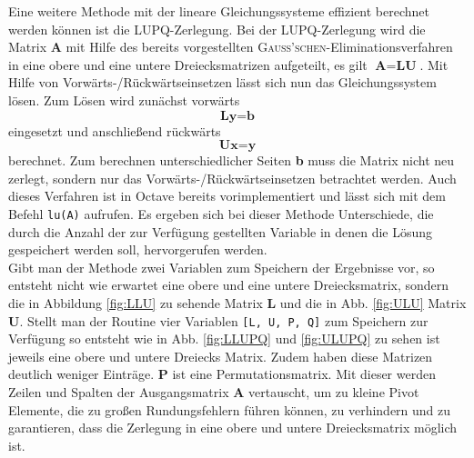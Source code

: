 Eine weitere Methode mit der lineare Gleichungssysteme effizient berechnet werden können ist die LUPQ-Zerlegung. Bei der LUPQ-Zerlegung wird die Matrix \textbf{A} mit Hilfe des bereits vorgestellten \textsc{Gauss'schen}-Eliminationsverfahren in eine obere und eine untere Dreiecksmatrizen aufgeteilt, es gilt $\textbf{A} = \textbf{L} \textbf{U}$. Mit Hilfe von Vorwärts-/Rückwärtseinsetzen lässt sich nun das Gleichungssystem lösen. Zum Lösen wird zunächst vorwärts $$ \textbf{Ly} = \textbf{b}$$ eingesetzt und anschließend rückwärts $$ \textbf{Ux} = \textbf{y}$$ berechnet. Zum berechnen unterschiedlicher Seiten \textbf{b} muss die Matrix nicht neu zerlegt, sondern nur das Vorwärts-/Rückwärtseinsetzen betrachtet werden. Auch dieses Verfahren ist in Octave bereits vorimplementiert und lässt sich mit dem Befehl \texttt{lu(A)} aufrufen. Es ergeben sich bei dieser Methode Unterschiede, die durch die Anzahl der zur Verfügung gestellten Variable in denen die Lösung gespeichert werden soll, hervorgerufen werden.\\
Gibt man der Methode zwei Variablen zum Speichern der Ergebnisse vor, so entsteht nicht wie erwartet eine obere und eine untere Dreiecksmatrix, sondern die in Abbildung \ref{fig:LLU} zu sehende Matrix \textbf{L} und die in Abb. \ref{fig:ULU} Matrix \textbf{U}. Stellt man der Routine vier Variablen \texttt{[L, U, P, Q]} zum Speichern zur Verfügung so entsteht wie in Abb. \ref{fig:LLUPQ} und \ref{fig:ULUPQ} zu sehen ist jeweils eine obere und untere Dreiecks Matrix. Zudem haben diese Matrizen deutlich weniger Einträge. \textbf{P} ist eine Permutationsmatrix. Mit dieser werden Zeilen und Spalten der Ausgangsmatrix \textbf{A} vertauscht, um zu kleine Pivot Elemente, die zu großen Rundungsfehlern führen können, zu verhindern und zu garantieren, dass die Zerlegung in eine obere und untere Dreiecksmatrix möglich ist. 

